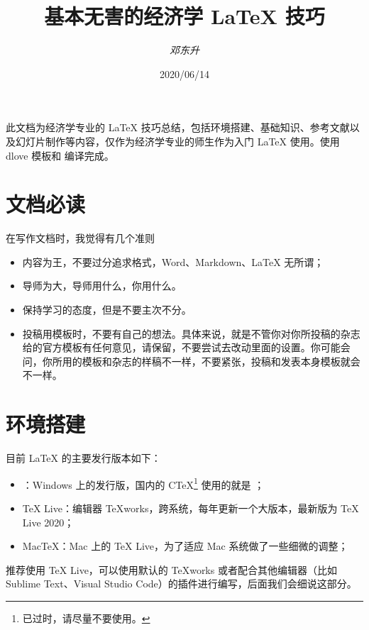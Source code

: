 \documentclass[10pt,a4paper]{dlove}
\title{\bfseries \textcolor{mcyan}{基本无害的经济学 \LaTeX{} 技巧}}
\author{\textcolor{mcyan}{\itshape 邓东升}}
\date{2020/06/14}
\begin{document}
\maketitle

\parbox{0.9\textwidth}{
  \sffamily
  此文档为经济学专业的 \LaTeX{} 技巧总结，包括环境搭建、基础知识、参考文献以及幻灯片制作等内容，仅作为经济学专业的师生作为入门 \LaTeX{} 使用。使用 dlove \heart{} 模板和  编译完成。
}

\section{文档必读}
在写作文档时，我觉得有几个准则
\begin{itemize}
  \item 内容为王，不要过分追求格式，Word、Markdown、\LaTeX{} 无所谓；
  \item 导师为大，导师用什么，你用什么。
  \item 保持学习的态度，但是不要主次不分。
  \item 投稿用模板时，不要有自己的想法。具体来说，就是不管你对你所投稿的杂志给的官方模板有任何意见，请保留，不要尝试去改动里面的设置。你可能会问，你所用的模板和杂志的样稿不一样，不要紧张，投稿和发表本身模板就会不一样。
\end{itemize}

\section{环境搭建}
目前 \LaTeX{} 的主要发行版本如下：
\begin{itemize}
  \item {}：Windows 上的发行版，国内的 C\TeX{}\footnote{已过时，请尽量不要使用。} 使用的就是 ；
  \item \TeX{} Live：编辑器 \TeX{}works，跨系统，每年更新一个大版本，最新版为 TeX Live 2020；
  \item Mac\TeX{}：Mac 上的 \TeX{} Live，为了适应 Mac 系统做了一些细微的调整；
\end{itemize}

推荐使用 \TeX{} Live，可以使用默认的 \TeX{}works 或者配合其他编辑器（比如 Sublime Text、Visual Studio Code）的插件进行编写，后面我们会细说这部分。
\end{document}
